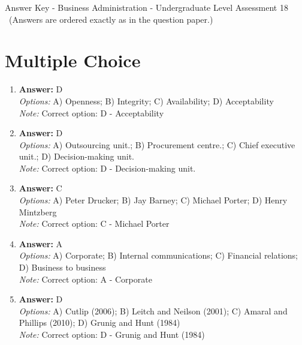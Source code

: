 \documentclass[12pt]{article}
\begin{document}
\begin{center}
Answer Key - Business Administration - Undergraduate Level Assessment 18 \
\small (Answers are ordered exactly as in the question paper.)
\end{center}

\section*{Multiple Choice}
\begin{enumerate}[label=\arabic*.]
\item \textbf{Answer:} D
\\ \textit{Options:} A) Openness; B) Integrity; C) Availability; D) Acceptability
\\ \textit{Note:} Correct option: D - Acceptability
\item \textbf{Answer:} D
\\ \textit{Options:} A) Outsourcing unit.; B) Procurement centre.; C) Chief executive unit.; D) Decision-making unit.
\\ \textit{Note:} Correct option: D - Decision-making unit.
\item \textbf{Answer:} C
\\ \textit{Options:} A) Peter Drucker; B) Jay Barney; C) Michael Porter; D) Henry Mintzberg
\\ \textit{Note:} Correct option: C - Michael Porter
\item \textbf{Answer:} A
\\ \textit{Options:} A) Corporate; B) Internal communications; C) Financial relations; D) Business to business
\\ \textit{Note:} Correct option: A - Corporate
\item \textbf{Answer:} D
\\ \textit{Options:} A) Cutlip (2006); B) Leitch and Neilson (2001); C) Amaral and Phillips (2010); D) Grunig and Hunt (1984)
\\ \textit{Note:} Correct option: D - Grunig and Hunt (1984)
\end{enumerate}
\end{document}
